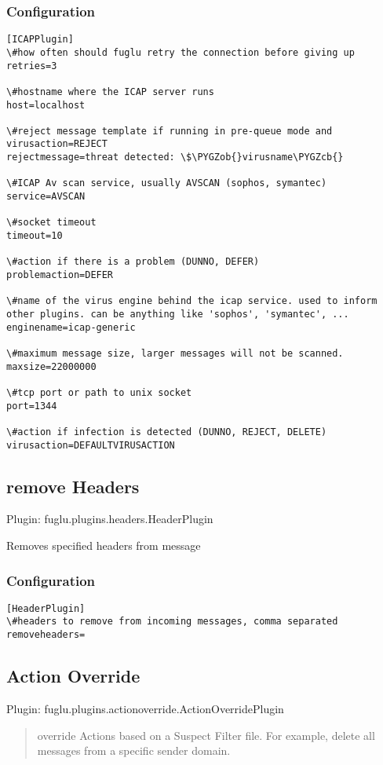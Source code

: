 \documentclass[letterpaper,10pt,english]{sphinxmanual}
\def\PYGZob{\char`\{}
\def\PYGZcb{\char`\}}
\begin{document}
\subsubsection{Configuration}
\label{plugins-index:id7}
\begin{Verbatim}[commandchars=\\\{\}]
[ICAPPlugin]
\#how often should fuglu retry the connection before giving up
retries=3

\#hostname where the ICAP server runs
host=localhost

\#reject message template if running in pre-queue mode and virusaction=REJECT
rejectmessage=threat detected: \$\PYGZob{}virusname\PYGZcb{}

\#ICAP Av scan service, usually AVSCAN (sophos, symantec)
service=AVSCAN

\#socket timeout
timeout=10

\#action if there is a problem (DUNNO, DEFER)
problemaction=DEFER

\#name of the virus engine behind the icap service. used to inform other plugins. can be anything like 'sophos', 'symantec', ...
enginename=icap-generic

\#maximum message size, larger messages will not be scanned.
maxsize=22000000

\#tcp port or path to unix socket
port=1344

\#action if infection is detected (DUNNO, REJECT, DELETE)
virusaction=DEFAULTVIRUSACTION
\end{Verbatim}


\subsection{remove Headers}
\label{plugins-index:remove-headers}
Plugin: fuglu.plugins.headers.HeaderPlugin

Removes specified headers from message


\subsubsection{Configuration}
\label{plugins-index:id8}
\begin{Verbatim}[commandchars=\\\{\}]
[HeaderPlugin]
\#headers to remove from incoming messages, comma separated
removeheaders=
\end{Verbatim}


\subsection{Action Override}
\label{plugins-index:action-override}
Plugin: fuglu.plugins.actionoverride.ActionOverridePlugin
\begin{quote}

override Actions based on a Suspect Filter file. For example, delete all messages from a specific sender domain.
\end{quote}
\end{document}
